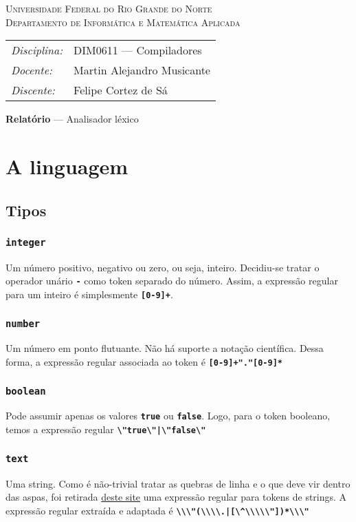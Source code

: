 \documentclass[12pt, a4paper]{article}
\newcommand{\ic}[1]{\textbf{\lstinline{#1}}}
\begin{document}
\begin{center}
    \textsc{Universidade Federal do Rio Grande do Norte} \\
    \textsc{Departamento de Informática e Matemática Aplicada}
\end{center}

\bigskip

\begin{tabular}{@{}ll@{}}
    \emph{Disciplina:} & DIM0611 --- Compiladores \\
    \emph{Docente:}    & Martin Alejandro Musicante \\
    \emph{Discente:}   & Felipe Cortez de Sá \\
\end{tabular}

\bigskip

\begin{center}
\large \textbf{Relatório} --- Analisador léxico
\end{center}

\section{A linguagem}
\subsection{Tipos}
\subsubsection{\ic{integer}}
Um número positivo, negativo ou zero, ou seja, inteiro. Decidiu-se tratar o
operador unário \ic{-} como token separado do número. Assim, a
expressão regular para um inteiro é simplesmente \ic{[0-9]+}.

\subsubsection{\ic{number}}
Um número em ponto flutuante. Não há suporte a notação científica. Dessa forma,
a expressão regular associada ao token é \ic{[0-9]+"."[0-9]*}

\subsubsection{\ic{boolean}}
Pode assumir apenas os valores \ic{true} ou \ic{false}. Logo, para o token
booleano, temos a expressão regular \ic{\"true\"|\"false\"}

\subsubsection{\ic{text}}
Uma string. Como é não-trivial tratar as quebras de linha e o que deve vir
dentro das aspas, foi retirada
\href{http://www.lysator.liu.se/c/ANSI-C-grammar-l.html}{deste site} uma
expressão regular para tokens de strings. A expressão regular extraída e
adaptada é \ic{\\\"(\\\\.|[\^\\\\\"])*\\\"}
\end{document}
